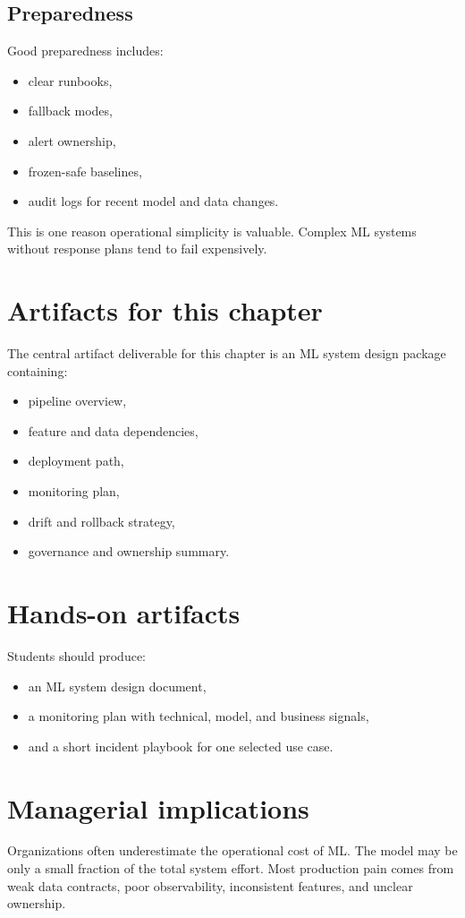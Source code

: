 \subsection{Preparedness}
Good preparedness includes:
\begin{itemize}
  \item clear runbooks,
  \item fallback modes,
  \item alert ownership,
  \item frozen-safe baselines,
  \item audit logs for recent model and data changes.
\end{itemize}

This is one reason operational simplicity is valuable.
Complex ML systems without response plans tend to fail expensively.

\section{Artifacts for this chapter}
The central artifact deliverable for this chapter is an ML system design package containing:
\begin{itemize}
  \item pipeline overview,
  \item feature and data dependencies,
  \item deployment path,
  \item monitoring plan,
  \item drift and rollback strategy,
  \item governance and ownership summary.
\end{itemize}

\section{Hands-on artifacts}
Students should produce:
\begin{itemize}
  \item an ML system design document,
  \item a monitoring plan with technical, model, and business signals,
  \item and a short incident playbook for one selected use case.
\end{itemize}

\section{Managerial implications}
Organizations often underestimate the operational cost of ML.
The model may be only a small fraction of the total system effort.
Most production pain comes from weak data contracts, poor observability, inconsistent features, and unclear ownership.

